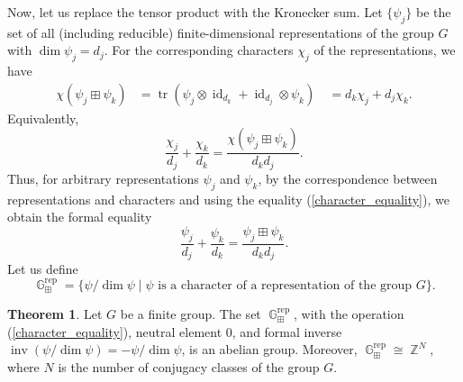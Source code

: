 \documentclass[14pt, dvipsnames]{extarticle}
\theoremstyle{definition}
\newtheorem{theorem}{Theorem}
\theoremstyle{definition}
\theoremstyle{remark}
\DeclareMathOperator{\G}{\mathbb{G}}
\DeclareMathOperator{\id}{\mathrm{id}}
\DeclareMathOperator{\inv}{\mathrm{inv}}
\DeclareMathOperator{\Z}{\mathbb{Z}}
\DeclareMathOperator{\rep}{\mathrm{rep}}
\DeclareMathOperator{\tr}{\mathrm{tr}}
\begin{document}
Now, let us replace the tensor product with the Kronecker sum. Let $\{\psi_j\}$ be the set of all (including reducible) finite-dimensional representations of the group $G$ with $\dim \psi_j = d_j$. For the corresponding characters ${\chi_j}$ of the representations, we have
\begin{equation}
\begin{aligned}
\chi(\psi_j \boxplus \psi_k) &= \tr(\psi_j \otimes \id_{d_k} + \id_{d_j} \otimes \psi_k) \
&= d_k \chi_j + d_j \chi_k.
\end{aligned}
\end{equation}
Equivalently,
\begin{equation}\label{character_equality}
\frac{\chi_j}{d_j} + \frac{\chi_k}{d_k} = \frac{\chi(\psi_j \boxplus \psi_k)}{d_k d_j}.
\end{equation}
Thus, for arbitrary representations $\psi_j$ and $\psi_k$, by the correspondence between representations and characters and using the equality (\ref{character_equality}), we obtain the formal equality
\begin{equation}\label{rep_equality}
\frac{\psi_j}{d_j} + \frac{\psi_k}{d_k} = \frac{\psi_j \boxplus \psi_k}{d_k d_j}.
\end{equation}
Let us define
$$\G^{\rep}_{\boxplus} = \{\psi / \dim \psi \mid \psi \text{ is a character of a representation of the group } G\}.$$

\begin{theorem}\label{Kronecker_sum_group}
Let $G$ be a finite group. The set $\G^{\rep}_{\boxplus}$, with the operation (\ref{character_equality}), neutral element 0, and formal inverse $\inv(\psi / \dim \psi) = -\psi / \dim \psi$, is an abelian group. Moreover, $\G^{\rep}_{\boxplus} \cong \Z^N$, where $N$ is the number of conjugacy classes of the group $G$.
\end{theorem}
\end{document}
